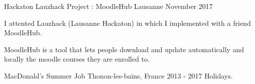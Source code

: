 \begin{cventries}

\cventry
{Hackaton} %
{Lauzhack Project : MoodleHub} %
{Lausanne} %
{November 2017} %
{ %
	\begin{cvitems}
		\item {I attented Lauzhack (Lausanne Hackaton) in which I implemented with a friend MoodleHub.}
		\item {MoodleHub is a tool that lets people download and update automatically and locally the moodle courses they are enrolled to.}
	\end{cvitems}
}


\cventry
{MacDonald's} %
{Summer Job} %
{Thonon-les-bains, France} %
{2013 - 2017 Holidays.} %
{ %
}




\end{cventries}